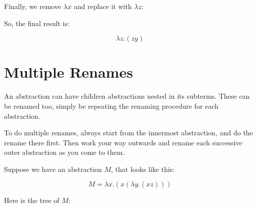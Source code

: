 \documentclass{book}
\numberwithin{equation}{chapter}
\begin{document}
\noindent
Finally, we remove $\lambda x$ and replace it with $\lambda z$:

\begin{center}
\end{center}

\noindent
So, the final result is:

\begin{equation}
\lambda z.(z y)
\end{equation}


\chapter{Multiple Renames}

An abstraction can have children abstractions nested in its subterms. These can be renamed too, simply be repeating the renaming procedure for each abstraction.

To do multiple renames, always start from the innermost abstraction, and do the rename there first. Then work your way outwards and rename each successive outer abstraction as you come to them.

Suppose we have an abstraction $M$, that looks like this:

\begin{equation}
M = \lambda x.(x (\lambda y.(x z)))
\end{equation}

\noindent
Here is the tree of $M$:

\begin{center}
\end{center}
\end{document}
